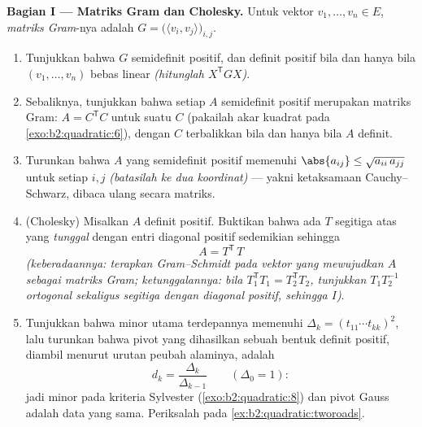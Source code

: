 \begin{problem}
\medskip
\noindent\textbf{Bagian I --- Matriks Gram dan Cholesky.} Untuk
vektor $v_1, \dots, v_n \in E$, \emph{matriks Gram}-nya adalah
$G = \bigl(\langle v_i, v_j\rangle\bigr)_{i,j}$.
\begin{enumerate}
  \item Tunjukkan bahwa $G$  semidefinit positif, dan
        definit positif bila dan hanya bila $(v_1, \dots, v_n)$
        bebas linear \emph{(hitunglah $X^{\mathsf T}GX$)}.
  \item Sebaliknya, tunjukkan bahwa setiap $A$  semidefinit
        positif merupakan matriks Gram: $A = C^{\mathsf T}C$
        untuk suatu $C$ (pakailah akar kuadrat pada
        \cref{exo:b2:quadratic:6}), dengan $C$ terbalikkan bila dan hanya
        bila $A$ definit.
  \item Turunkan bahwa $A$ yang semidefinit positif memenuhi
        $\abs{a_{ij}} \leq \sqrt{a_{ii}\,a_{jj}}$ untuk setiap $i,
        j$ \emph{(batasilah ke dua koordinat)} --- yakni
        ketaksamaan Cauchy--Schwarz, dibaca ulang secara matriks.
  \item (Cholesky) Misalkan $A$ definit positif. Buktikan bahwa
        ada $T$ segitiga atas yang \emph{tunggal} dengan
        entri diagonal positif sedemikian sehingga
        \[
        A = T^{\mathsf T}\,T
        \]
        \emph{(keberadaannya: terapkan Gram--Schmidt pada vektor
        yang mewujudkan $A$ sebagai matriks Gram; ketunggalannya: bila
        $T_1^{\mathsf T}T_1 = T_2^{\mathsf T}T_2$, tunjukkan
        $T_1T_2^{-1}$ ortogonal sekaligus segitiga dengan
        diagonal positif, sehingga $I$)}.
  \item Tunjukkan bahwa minor utama terdepannya memenuhi
        $\Delta_k = (t_{11}\cdots t_{kk})^2$, lalu turunkan bahwa
        pivot yang dihasilkan  sebuah
        bentuk definit positif, diambil menurut urutan peubah
        alaminya, adalah
        \[
        d_k = \frac{\Delta_k}{\Delta_{k-1}}
        \qquad (\Delta_0 = 1) :
        \]
        jadi minor pada kriteria Sylvester
        (\cref{exo:b2:quadratic:8}) dan pivot Gauss adalah
        data yang sama. Periksalah pada
        \cref{ex:b2:quadratic:tworoads}.
\end{enumerate}


\end{problem}
